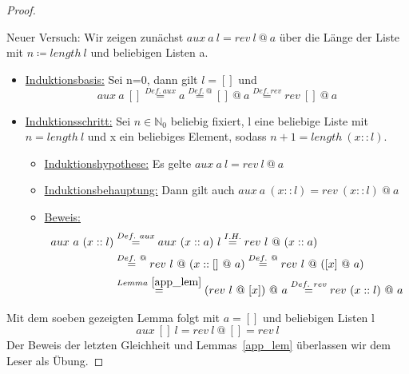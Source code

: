 \documentclass[hidelinks]{article}
\theoremstyle{plain}
\theoremstyle{definition}
\theoremstyle{rem}
\begin{document}
\begin{sloppypar}
\begin{proof}
\begin{itemize}
\begin{itemize}
	\end{itemize}
\end{itemize}
Neuer Versuch: Wir zeigen zunächst $aux\ a\ l = rev\ l\ @\ a$ über die Länge der Liste mit $n\coloneqq length\ l$ und beliebigen Listen a.
\begin{itemize}
\item \underline{Induktionsbasis:} Sei n=0, dann gilt $l=[]$ und
\begin{equation*}
	aux\ a\ []\stackrel{Def.\ aux}{=}a\stackrel{Def.\ @}{=}[]\ @\ a\stackrel{Def.\ rev}{=}rev\ []\ @\ a
\end{equation*}
\item \underline{Induktionsschritt:} Sei $n\in \mathbb{N}_0$ beliebig fixiert, l eine beliebige Liste mit $n=length\ l$ und x ein beliebiges Element, sodass $n+1=length\ (x::l)$.
	\begin{itemize}
	\item \underline{Induktionshypothese:} Es gelte $aux\ a\ l=rev\ l\ @\ a$
	\item \underline{Induktionsbehauptung:} Dann gilt auch $aux\ a\ (x::l)=rev\ (x::l)\ @\ a$
	\item \underline{Beweis:}
	\begin{align*}
		aux\ a\ (x::l)&\stackrel{Def.\ aux}{=}aux\ (x::a)\ l\stackrel{I.H.}{=}rev\ l\ @\ (x::a)\\
		&\stackrel{Def.\ @}{=}rev\ l\ @\ (x::[]\ @\ a)\stackrel{Def.\ @}{=}rev\ l\ @\ ([x]\ @\ a)\\
		&\stackrel{Lemma~\eqref{app_lem}}{=}(rev\ l\ @\ [x])\ @\ a\stackrel{Def.\ rev}{=}rev\ (x::l)\ @\ a
	\end{align*}
	\end{itemize}
\end{itemize}
Mit dem soeben gezeigten Lemma folgt mit $a=[]$ und beliebigen Listen l
\begin{equation*}
	aux\ []\ l=rev\ l\ @\ []=rev\ l
\end{equation*}
Der Beweis der letzten Gleichheit und Lemmas~\eqref{app_lem} überlassen wir dem Leser als Übung.
\end{proof}

\end{sloppypar}
\end{document}
